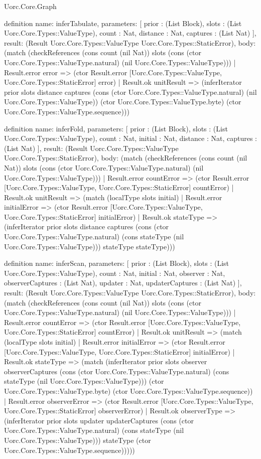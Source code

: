 \begin{lexlean}{Uorc.Core.Graph}
\begin{semanticmodule}
definition{
  name: inferTabulate,
  parameters: [
    prior : (List Block),
    slots : (List Uorc.Core.Types::ValueType),
    count : Nat,
    distance : Nat,
    captures : (List Nat)
  ],
  result: (Result Uorc.Core.Types::ValueType Uorc.Core.Types::StaticError),
  body: (match (checkReferences (cons count (nil Nat)) slots (cons (ctor Uorc.Core.Types::ValueType.natural) (nil Uorc.Core.Types::ValueType)))
    | Result.error error => (ctor Result.error [Uorc.Core.Types::ValueType, Uorc.Core.Types::StaticError] error)
    | Result.ok unitResult => (inferIterator prior slots distance captures (cons (ctor Uorc.Core.Types::ValueType.natural) (nil Uorc.Core.Types::ValueType)) (ctor Uorc.Core.Types::ValueType.byte) (ctor Uorc.Core.Types::ValueType.sequence)))
}

definition{
  name: inferFold,
  parameters: [
    prior : (List Block),
    slots : (List Uorc.Core.Types::ValueType),
    count : Nat,
    initial : Nat,
    distance : Nat,
    captures : (List Nat)
  ],
  result: (Result Uorc.Core.Types::ValueType Uorc.Core.Types::StaticError),
  body: (match (checkReferences (cons count (nil Nat)) slots (cons (ctor Uorc.Core.Types::ValueType.natural) (nil Uorc.Core.Types::ValueType)))
    | Result.error countError => (ctor Result.error [Uorc.Core.Types::ValueType, Uorc.Core.Types::StaticError] countError)
    | Result.ok unitResult => (match (localType slots initial)
      | Result.error initialError => (ctor Result.error [Uorc.Core.Types::ValueType, Uorc.Core.Types::StaticError] initialError)
      | Result.ok stateType => (inferIterator prior slots distance captures (cons (ctor Uorc.Core.Types::ValueType.natural) (cons stateType (nil Uorc.Core.Types::ValueType))) stateType stateType)))
}

definition{
  name: inferScan,
  parameters: [
    prior : (List Block),
    slots : (List Uorc.Core.Types::ValueType),
    count : Nat,
    initial : Nat,
    observer : Nat,
    observerCaptures : (List Nat),
    updater : Nat,
    updaterCaptures : (List Nat)
  ],
  result: (Result Uorc.Core.Types::ValueType Uorc.Core.Types::StaticError),
  body: (match (checkReferences (cons count (nil Nat)) slots (cons (ctor Uorc.Core.Types::ValueType.natural) (nil Uorc.Core.Types::ValueType)))
    | Result.error countError => (ctor Result.error [Uorc.Core.Types::ValueType, Uorc.Core.Types::StaticError] countError)
    | Result.ok unitResult => (match (localType slots initial)
      | Result.error initialError => (ctor Result.error [Uorc.Core.Types::ValueType, Uorc.Core.Types::StaticError] initialError)
      | Result.ok stateType => (match (inferIterator prior slots observer observerCaptures (cons (ctor Uorc.Core.Types::ValueType.natural) (cons stateType (nil Uorc.Core.Types::ValueType))) (ctor Uorc.Core.Types::ValueType.byte) (ctor Uorc.Core.Types::ValueType.sequence))
        | Result.error observerError => (ctor Result.error [Uorc.Core.Types::ValueType, Uorc.Core.Types::StaticError] observerError)
        | Result.ok observerType => (inferIterator prior slots updater updaterCaptures (cons (ctor Uorc.Core.Types::ValueType.natural) (cons stateType (nil Uorc.Core.Types::ValueType))) stateType (ctor Uorc.Core.Types::ValueType.sequence)))))
}


\end{semanticmodule}
\end{lexlean}
